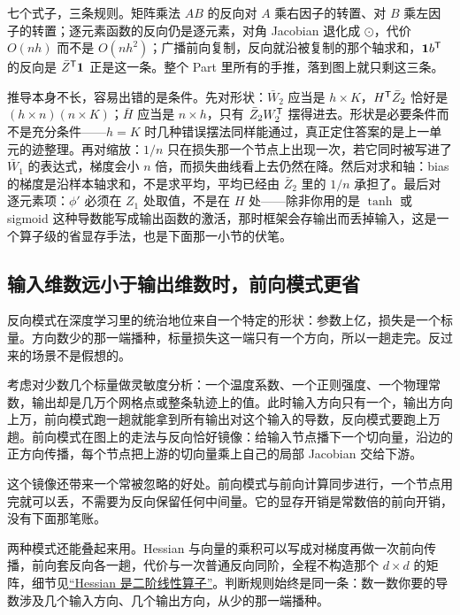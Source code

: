 七个式子，三条规则。矩阵乘法 \(AB\) 的反向对 \(A\) 乘右因子的转置、对 \(B\) 乘左因子的转置；逐元素函数的反向仍是逐元素，对角 Jacobian 退化成 \(\odot\)，代价 \(O(nh)\) 而不是 \(O(n h^2)\)；广播前向复制，反向就沿被复制的那个轴求和，\(\mathbf1b^{\mathsf{T}}\) 的反向是 \(\bar Z^{\mathsf{T}}\mathbf1\) 正是这一条。整个 Part 里所有的手推，落到图上就只剩这三条。

推导本身不长，容易出错的是条件。先对形状：\(\bar W_2\) 应当是 \(h\times K\)，\(H^{\mathsf{T}}\bar Z_2\) 恰好是 \((h\times n)(n\times K)\)；\(\bar H\) 应当是 \(n\times h\)，只有 \(\bar Z_2W_2^{\mathsf{T}}\) 摆得进去。形状是必要条件而不是充分条件——\(h=K\) 时几种错误摆法同样能通过，真正定住答案的是上一单元的迹整理。再对缩放：\(1/n\) 只在损失那一个节点上出现一次，若它同时被写进了 \(\bar W_1\) 的表达式，梯度会小 \(n\) 倍，而损失曲线看上去仍然在降。然后对求和轴：bias 的梯度是沿样本轴求和，不是求平均，平均已经由 \(\bar Z_2\) 里的 \(1/n\) 承担了。最后对逐元素项：\(\phi'\) 必须在 \(Z_1\) 处取值，不是在 \(H\) 处——除非你用的是 \(\tanh\) 或 sigmoid 这种导数能写成输出函数的激活，那时框架会存输出而丢掉输入，这是一个算子级的省显存手法，也是下面那一小节的伏笔。

\subsection{输入维数远小于输出维数时，前向模式更省}

反向模式在深度学习里的统治地位来自一个特定的形状：参数上亿，损失是一个标量。方向数少的那一端播种，标量损失这一端只有一个方向，所以一趟走完。反过来的场景不是假想的。

考虑对少数几个标量做灵敏度分析：一个温度系数、一个正则强度、一个物理常数，输出却是几万个网格点或整条轨迹上的值。此时输入方向只有一个，输出方向上万，前向模式跑一趟就能拿到所有输出对这个输入的导数，反向模式要跑上万趟。前向模式在图上的走法与反向恰好镜像：给输入节点播下一个切向量，沿边的正方向传播，每个节点把上游的切向量乘上自己的局部 Jacobian 交给下游。

这个镜像还带来一个常被忽略的好处。前向模式与前向计算同步进行，一个节点用完就可以丢，不需要为反向保留任何中间量。它的显存开销是常数倍的前向开销，没有下面那笔账。

两种模式还能叠起来用。Hessian 与向量的乘积可以写成对梯度再做一次前向传播，前向套反向各一趟，代价与一次普通反向同阶，全程不构造那个 \(d\times d\) 的矩阵，细节见\hyperref[sec:10-Matrix-Calculus/02-Differentials/03]{``Hessian 是二阶线性算子''}。判断规则始终是同一条：数一数你要的导数涉及几个输入方向、几个输出方向，从少的那一端播种。

